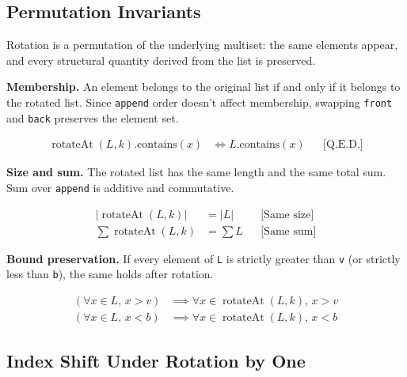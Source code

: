 \subsection{Permutation Invariants}

Rotation is a permutation of the underlying multiset: the same elements
appear, and every structural quantity derived from the list is
preserved.

\textbf{Membership.} An element belongs to the original list if and only
if it belongs to the rotated list. Since \texttt{append} order doesn't
affect membership, swapping \texttt{front} and \texttt{back} preserves
the element set.

\begin{equation*}
\begin{aligned}
\operatorname{rotateAt}(L, k).\text{contains}(x) &\iff L.\text{contains}(x)
  &&\text{[Q.E.D.]}
\end{aligned}
\end{equation*}

\textbf{Size and sum.} The rotated list has the same length and the same
total sum. Sum over \texttt{append} is additive and commutative.

\begin{equation*}
\begin{aligned}
|\operatorname{rotateAt}(L, k)| &= |L| &&\text{[Same size]} \\
\sum \operatorname{rotateAt}(L, k) &= \sum L &&\text{[Same sum]}
\end{aligned}
\end{equation*}

\textbf{Bound preservation.} If every element of \texttt{L} is strictly
greater than \texttt{v} (or strictly less than \texttt{b}), the same
holds after rotation.

\begin{equation*}
\begin{aligned}
(\forall x \in L,\, x > v) &\implies \forall x \in \operatorname{rotateAt}(L, k),\, x > v \\
(\forall x \in L,\, x < b) &\implies \forall x \in \operatorname{rotateAt}(L, k),\, x < b
\end{aligned}
\end{equation*}

\subsection{Index Shift Under Rotation by One}

